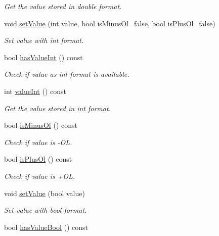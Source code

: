 \begin{DoxyCompactItemize}
\begin{DoxyCompactList}\small\item\em Get the value stored in double format. \end{DoxyCompactList}\item 
void \hyperlink{classmdt_value_ae4a84a502223cfd47538474dee897ad0}{setValue} (int value, bool isMinusOl=false, bool isPlusOl=false)
\begin{DoxyCompactList}\small\item\em Set value with int format. \end{DoxyCompactList}\item 
\hypertarget{classmdt_value_a4aeeb92ec5b1f0a625cbd2d944ae761b}{
bool \hyperlink{classmdt_value_a4aeeb92ec5b1f0a625cbd2d944ae761b}{hasValueInt} () const }
\label{classmdt_value_a4aeeb92ec5b1f0a625cbd2d944ae761b}

\begin{DoxyCompactList}\small\item\em Check if value as int format is available. \end{DoxyCompactList}\item 
\hypertarget{classmdt_value_a421b294b1540ce7c47aada2ea66201a1}{
int \hyperlink{classmdt_value_a421b294b1540ce7c47aada2ea66201a1}{valueInt} () const }
\label{classmdt_value_a421b294b1540ce7c47aada2ea66201a1}

\begin{DoxyCompactList}\small\item\em Get the value stored in int format. \end{DoxyCompactList}\item 
\hypertarget{classmdt_value_a4de0d0c8a02cdd4c02adace4108db326}{
bool \hyperlink{classmdt_value_a4de0d0c8a02cdd4c02adace4108db326}{isMinusOl} () const }
\label{classmdt_value_a4de0d0c8a02cdd4c02adace4108db326}

\begin{DoxyCompactList}\small\item\em Check if value is -\/OL. \end{DoxyCompactList}\item 
\hypertarget{classmdt_value_a033ad1d20812dddf38530a5f190033da}{
bool \hyperlink{classmdt_value_a033ad1d20812dddf38530a5f190033da}{isPlusOl} () const }
\label{classmdt_value_a033ad1d20812dddf38530a5f190033da}

\begin{DoxyCompactList}\small\item\em Check if value is +OL. \end{DoxyCompactList}\item 
void \hyperlink{classmdt_value_ab526b9b9d04b641394b1679336b59c32}{setValue} (bool value)
\begin{DoxyCompactList}\small\item\em Set value with bool format. \end{DoxyCompactList}\item 
\hypertarget{classmdt_value_a8ec9abcaa40b5ec891ff740913f1aca8}{
bool \hyperlink{classmdt_value_a8ec9abcaa40b5ec891ff740913f1aca8}{hasValueBool} () const }
\label{classmdt_value_a8ec9abcaa40b5ec891ff740913f1aca8}


\end{DoxyCompactItemize}
